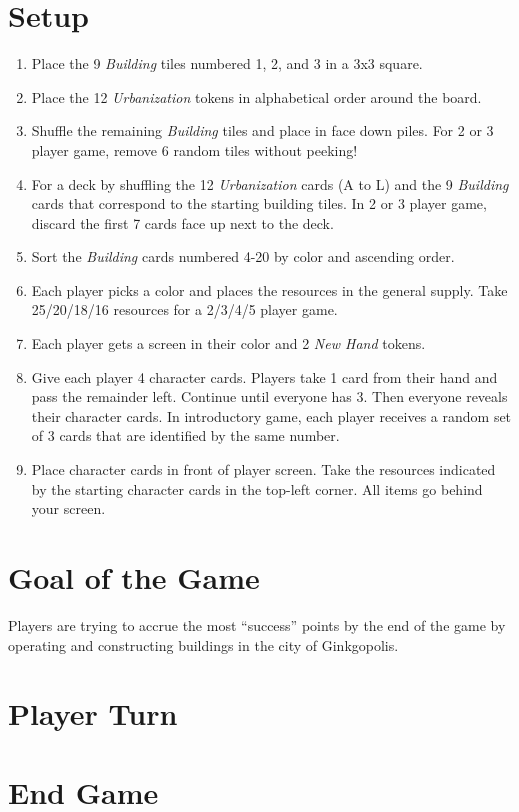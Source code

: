 \documentclass[12pt]{article}
\newenvironment{enumerateCustom}
{\begin{enumerate}
  \setlength{\itemsep}{1pt}
  \setlength{\parskip}{0pt}
  \setlength{\parsep}{0pt}}
{\end{enumerate}}
\begin{document}
\begin{mdframed}[style = customFrame]
\begin{multicols*}{2}

\section*{Setup}
\begin{enumerateCustom}
	\item Place the 9 \emph{Building} tiles numbered 1, 2, and 3 in a 3x3 square.
	\item Place the 12 \emph{Urbanization} tokens in alphabetical order around the board.
	\item Shuffle the remaining \emph{Building} tiles and place in face down piles. For 2 or 3 player game, remove 6 random tiles without peeking!
	\item For a deck by shuffling the 12 \emph{Urbanization} cards (A to L) and the 9 \emph{Building} cards that correspond to the starting building tiles. In 2 or 3 player game, discard the first 7 cards face up next to the deck.
	\item Sort the \emph{Building} cards numbered 4-20 by color and ascending order.
	\item Each player picks a color and places the resources in the general supply. Take 25/20/18/16 resources for a 2/3/4/5 player game.
	\item Each player gets a screen in their color and 2 \emph{New Hand} tokens.
	\item Give each player 4 character cards. Players take 1 card from their hand and pass the remainder left. Continue until everyone has 3. Then everyone reveals their character cards. In introductory game, each player receives a random set of 3 cards that are identified by the same number.
	\item Place character cards in front of player screen. Take the resources indicated by the starting character cards in the top-left corner. All items go behind your screen.
\end{enumerateCustom}

\section*{Goal of the Game}
Players are trying to accrue the most ``success'' points by the end of the game by operating and constructing buildings in the city of Ginkgopolis.

\section*{Player Turn}
\section*{End Game}

\end{multicols*}
\end{mdframed}
\end{document}
